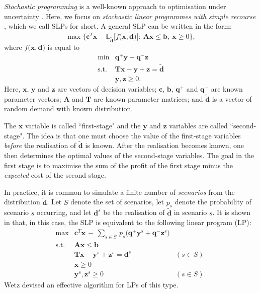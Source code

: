 \documentclass[a4paper,11pt]{article}
\begin{document}
\emph{Stochastic programming} is a well-known approach to optimisation under uncertainty \cite{BL11,KW94,RS03}. Here, we focus on \emph{stochastic linear programmes with simple recourse} \cite{Be55,Da55}, which we call SLPs for short. A general SLP can be written in the form:
\[
\max \Big\{ \mathbf{c}^T \mathbf{x} - \mathbb{E}_{\mathbf{\tilde d}}
\big[ f \big( \mathbf{x}, \mathbf{\tilde d} \big) \big]: \:
\mathbf{A} \mathbf{x} \le \mathbf{b}, \: \mathbf{x} \ge 0 \Big\},
\]
where $f \big( \mathbf{x}, \mathbf{\tilde d} \big)$ is equal to
\begin{eqnarray*}
\min    & \mathbf{q^+} \mathbf{y} + \mathbf{q^-} \mathbf{z} \\
\text{s.t.} & \mathbf{T} \mathbf{x} - \mathbf{y} + \mathbf{z}
              = \mathbf{\tilde d}\\
            & \mathbf{y}, \mathbf{z} \ge 0.
\end{eqnarray*}
Here, $\mathbf{x}$, $\mathbf{y}$ and $\mathbf{z}$ are vectors of decision variables; $\mathbf{c}$, $\mathbf{b}$, $\mathbf{q^+}$ and $\mathbf{q^-}$ are known parameter vectors; $\mathbf{A}$ and $\mathbf{T}$ are known parameter matrices; and $\mathbf{\tilde d}$ is a vector of random demand with known distribution.

The $\mathbf{x}$ variable is called ``first-stage" and the $\mathbf{y}$ and $\mathbf{z}$ variables are called ``second-stage". The idea is that one must choose the value of the first-stage variables \emph{before} the realisation of $\mathbf{\tilde d}$ is known. After the realisation becomes known, one then determines the optimal values of the second-stage variables. The goal in the first stage is to maximise the sum of the profit of the first stage minus the \emph{expected} cost of the second stage.

In practice, it is common to simulate a finite number of \emph{scenarios} from the distribution $\mathbf{\tilde d}$. Let $S$ denote the set of scenarios, let $p_s$ denote the probability of scenario $s$ occurring, and let $\mathbf{d}^s$ be the realisation of $\mathbf{\tilde d}$ in scenario $s$. It is shown in \cite{Be55,Da55} that, in this case, the SLP is equivalent to the following linear program (LP):
\begin{eqnarray*}
\max	    & \mathbf{c}^T \mathbf{x} \, - \, \sum_{s \in S} \, p_s
    \big( \mathbf{q^+} \mathbf{y}^s + \mathbf{q^-} \mathbf{z}^s \big)\\
\text{s.t.} & \mathbf{A} \mathbf{x} \le \mathbf{b} \\
	        & \mathbf{T} \mathbf{x} - \mathbf{y}^s + \mathbf{z}^s =
	        \mathbf{d}^s & (s \in S) \\
	        & \mathbf{x} \ge 0 \\
	        & \mathbf{y}^s, \mathbf{z}^s \ge 0 & (s \in S).
\end{eqnarray*}
Wetz \cite{We84} devised an effective algorithm for LPs of this type.
\end{document}
